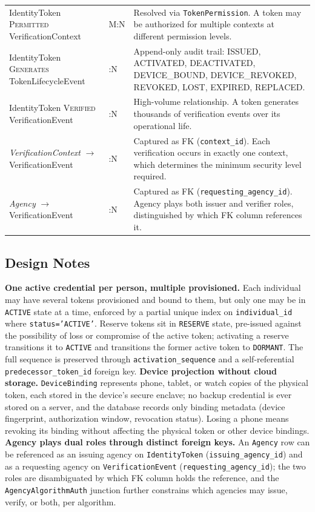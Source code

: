 \documentclass[11pt,letterpaper]{article}
\newcommand{\entity}[1]{\texttt{\color{navydark}#1}}
\begin{document}
\begin{table}[H]
\begin{tabularx}{\textwidth}{>{\RaggedRight\arraybackslash}p{1.95in} >{\centering\arraybackslash}p{0.85in} >{\RaggedRight\arraybackslash}X}
IdentityToken \textsc{Permitted} VerificationContext & M:N & Resolved via \entity{TokenPermission}. A token may be authorized for multiple contexts at different permission levels. \\
IdentityToken \textsc{Generates} TokenLifecycleEvent & 1:N & Append-only audit trail: ISSUED, ACTIVATED, DEACTIVATED, DEVICE\_BOUND, DEVICE\_REVOKED, REVOKED, LOST, EXPIRED, REPLACED. \\
IdentityToken \textsc{Verified} VerificationEvent & 1:N & High-volume relationship. A token generates thousands of verification events over its operational life. \\
\midrule
\textit{VerificationContext} $\rightarrow$ VerificationEvent & 1:N & Captured as FK (\texttt{context\_id}). Each verification occurs in exactly one context, which determines the minimum security level required. \\
\textit{Agency} $\rightarrow$ VerificationEvent & 1:N & Captured as FK (\texttt{requesting\_agency\_id}). Agency plays both issuer and verifier roles, distinguished by which FK column references it. \\
\bottomrule
\end{tabularx}
\end{table}

\subsection{Design Notes}

\textbf{One active credential per person, multiple provisioned.} Each individual may have several tokens provisioned and bound to them, but only one may be in \texttt{ACTIVE} state at a time, enforced by a partial unique index on \texttt{individual\_id} where \texttt{status='ACTIVE'}. Reserve tokens sit in \texttt{RESERVE} state, pre-issued against the possibility of loss or compromise of the active token; activating a reserve transitions it to \texttt{ACTIVE} and transitions the former active token to \texttt{DORMANT}. The full sequence is preserved through \texttt{activation\_sequence} and a self-referential \texttt{predecessor\_token\_id} foreign key. \textbf{Device projection without cloud storage.} \entity{DeviceBinding} represents phone, tablet, or watch copies of the physical token, each stored in the device's secure enclave; no backup credential is ever stored on a server, and the database records only binding metadata (device fingerprint, authorization window, revocation status). Losing a phone means revoking its binding without affecting the physical token or other device bindings. \textbf{Agency plays dual roles through distinct foreign keys.} An \entity{Agency} row can be referenced as an issuing agency on \entity{IdentityToken} (\texttt{issuing\_agency\_id}) and as a requesting agency on \entity{VerificationEvent} (\texttt{requesting\_agency\_id}); the two roles are disambiguated by which FK column holds the reference, and the \entity{AgencyAlgorithmAuth} junction further constrains which agencies may issue, verify, or both, per algorithm.
\end{document}
